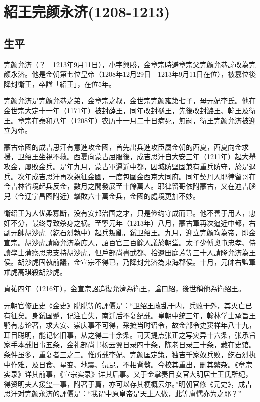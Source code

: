 
\section{紹王完颜永济\tiny(1208-1213)}

\subsection{生平}

完颜允济（？－1213年9月11日），小字興勝，金章宗時避章宗父完顏允恭諱改為完颜永济。他是金朝第七位皇帝（1208年12月29日—1213年9月11日在位），被篡位後降封衛王，卒諡「紹王」，在位5年。

完颜允济是完顏允恭之弟，金章宗之叔，金世宗完颜雍第七子，母元妃李氏。他在金世宗大定十一年（1171年）被封薛王，同年改封禭王，先後改封潞王、韓王及衛王。章宗在泰和八年（1208年）农历十一月二十日病死，無嗣，衛王完颜允济被迎立为帝。

蒙古帝國的成吉思汗有意進攻金國，首先出兵進攻臣屬金朝的西夏，西夏向金求援，卫绍王坐視不救。西夏向蒙古屈服後，成吉思汗自大安三年（1211年）起大舉攻金，屢敗金兵。是年九月，蒙古軍逼近中都，因城防堅固兼有重兵防守，於是退兵。次年成吉思汗再次親征金國，一度包圍金西京大同府。同年契丹人耶律留哥在今吉林省境起兵反金，數月之間發展至十餘萬人。耶律留哥依附蒙古，又在迪吉腦兒（今辽宁昌图附近）擊敗六十萬金兵，金國的處境更加不妙。

衛绍王为人优柔寡断，没有安邦治国之才，只是俭约守成而已。他不善于用人，忠奸不分，最终导致杀身之祸。至寧元年（1213年）八月，蒙古軍再次逼近中都，右副元帥胡沙虎（紇石烈執中）起兵叛亂，弑卫绍王。九月，迎立完顏珣為帝，即金宣宗。胡沙虎請廢允济為庶人，詔百官三百餘人議於朝堂。太子少傅奧屯忠孝、侍讀學士蒲察思忠支持胡沙虎，但戶部尚書武都、拾遺田庭芳等三十人請降允济為王侯。胡沙虎固執前議，金宣宗不得已，乃降封允济為東海郡侯。十月，元帥右監軍朮虎高琪殺胡沙虎。

貞祐四年（1216年），金宣宗詔追復允濟為衛王，諡曰紹，後世稱他為衛绍王。

元朝官修正史《金史》脱脱等的評價是：“卫绍王政乱于内，兵败于外，其灭亡已有征矣。身弑国蹙，记注亡失，南迁后不复纪载。皇朝中统三年，翰林学士承旨王鹗有志论著，求大安、崇庆事不可得，采摭当时诏令，故金部令史窦祥年八十九，耳目聪明，能记忆旧事，从之得二十余条。司天提点张正之写灾异十六条，张承旨家手本载旧事五条，金礼部尚书杨云翼日录四十条，陈老日录三十条，藏在史馆。条件虽多，重复者三之二。惟所载李妃、完颜匡定策，独吉千家奴兵败，纥石烈执中作难，及日食、星变、地震、氛昆，不相背盭。今校其重出，删其繁杂。《章宗实录》详其前事，《宣宗实录》详其后事。又于金掌奏目女官大明居士王氏所纪，得资明夫人援玺一事，附著于篇，亦可以存其梗概云尔。”明朝官修《元史》，成吉思汗对完颜永济的評價是：“我谓中原皇帝是天上人做，此等庸懦亦为之耶？”

